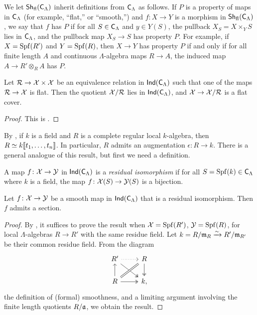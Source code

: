 \documentclass[phd,cornellheadings,draft]{cornell}
\begin{document}
We let $\operatorname{\mathsf{Sh}}_{\mathrm{fl}}(\mathsf{C}_\Lambda)$ inherit definitions from 
$\mathsf{C}_\Lambda$ as follows. If $P$ is a property of maps in 
$\mathsf{C}_\Lambda$ (for example, ``flat,'' or ``smooth,'') and 
$f\colon X\to Y$ is a morphism in $\operatorname{\mathsf{Sh}}_{\mathrm{fl}}(\mathsf{C}_\Lambda)$, we say 
that $f$ has $P$ if for all $S\in \mathsf{C}_\Lambda$ and $y\in Y(S)$, the 
pullback $X_S=X\times_Y S$ lies in $\mathsf{C}_\Lambda$, and the pullback map 
$X_S\to S$ has property $P$. For example, if $X=\operatorname{Spf}(R')$ and $Y=\operatorname{Spf}(R)$, then 
$X\to Y$ has property $P$ if and only if for all finite length $A$ and 
continuous $\Lambda$-algebra maps $R\to A$, the induced map 
$A\to R'\otimes_R A$ has $P$.

\begin{theorem}\label{thm:quotients-ind}
Let $\mathcal{R}\to \mathcal{X}\times \mathcal{X}$ be an equivalence relation in 
$\operatorname{\mathsf{Ind}}(\mathsf{C}_\Lambda)$ such that one of the maps $\mathcal{R}\to \mathcal{X}$ is 
flat. Then the quotient $\mathcal{X}/\mathcal{R}$ lies in $\operatorname{\mathsf{Ind}}(\mathsf{C}_\Lambda)$, and 
$\mathcal{X}\to \mathcal{X}/\mathcal{R}$ is a flat cover. 
\end{theorem}
\begin{proof}
This is \cite[VII\textsubscript{B} 1.4]{sga3-1}. 
\end{proof}

By \cite[29.7]{matsumura-1989}, if $k$ is a field and $R$ is a complete regular 
local $k$-algebra, then $R\simeq k\llbracket t_1,\dots,t_n \rrbracket$. In particular, $R$ 
admits an augmentation $\epsilon\colon R\to k$. There is a general analogue of 
this result, but first we need a definition. 

\begin{definition}
A map $f\colon \mathcal{X}\to \mathcal{Y}$ in $\operatorname{\mathsf{Ind}}(\mathsf{C}_\Lambda)$ is a 
\emph{residual isomorphism} if for all $S=\operatorname{Spf}(k)\in \mathsf{C}_\Lambda$ where 
$k$ is a field, the map $f\colon \mathcal{X}(S)\to \mathcal{Y}(S)$ is a bijection. 
\end{definition}

\begin{lemma}\label{thm:smooth-section}
Let $f\colon \mathcal{X}\to \mathcal{Y}$ be a smooth map in $\operatorname{\mathsf{Ind}}(\mathsf{C}_\Lambda)$ 
that is a residual isomorphism. Then $f$ admits a section. 
\end{lemma}
\begin{proof}
By \cite[VII\textsubscript{B} 0.1.1]{sga3-1}, it suffices to prove the result 
when $\mathcal{X}=\operatorname{Spf}(R')$, $\mathcal{Y}=\operatorname{Spf}(R)$, for local $\Lambda$-algebras $R\to R'$ 
with the same residue field. Let $k=R/\mathfrak{m}_R \xrightarrow\sim R'/\mathfrak{m}_{R'}$ be their common 
residue field. From the diagram 
\[
\begin{tikzcd}
	R' \ar[r, dotted] \ar[dr, two heads]
		& R \ar[d, two heads] \\
	R \ar[u] \ar[ur, equal] \ar[r, two heads]
		& k ,
\end{tikzcd}
\]
the definition of (formal) smoothness, and a limiting argument involving the 
finite length quotients $R/\mathfrak{a}$, we obtain the result. 
\end{proof}
\end{document}

